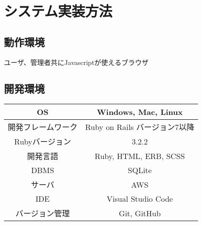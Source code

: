 \chapter{システム実装方法}
\section*{動作環境}
ユーザ、管理者共にJavascriptが使えるブラウザ
\section*{開発環境}
\begin{tabular}{|c|c|} \hline
   OS & Windows, Mac, Linux\\  \hline
   開発フレームワーク & Ruby on Rails  バージョン7以降 \\ \hline
   Rubyバージョン & 3.2.2\\  \hline
   開発言語 & Ruby, HTML, ERB, SCSS\\ \hline
   DBMS & SQLite \\ \hline
   サーバ & AWS \\ \hline
   IDE & Visual Studio Code \\ \hline
   バージョン管理 & Git, GitHub \\ \hline
 \end{tabular}
